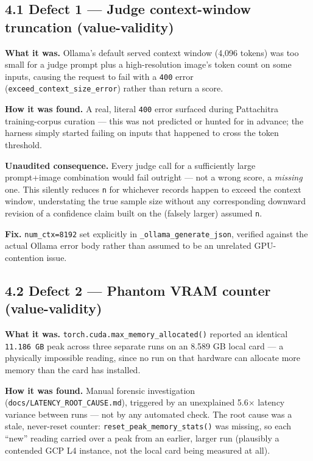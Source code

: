 \hypertarget{defect-1-judge-context-window-truncation-value-validity}{%
\subsection{4.1 Defect 1 --- Judge context-window truncation
(value-validity)}\label{defect-1-judge-context-window-truncation-value-validity}}

\textbf{What it was.} Ollama's default served context window (4,096
tokens) was too small for a judge prompt plus a high-resolution image's
token count on some inputs, causing the request to fail with a
\texttt{400} error (\texttt{exceed\_context\_size\_error}) rather than
return a score.

\textbf{How it was found.} A real, literal \texttt{400} error surfaced
during Pattachitra training-corpus curation --- this was not predicted
or hunted for in advance; the harness simply started failing on inputs
that happened to cross the token threshold.

\textbf{Unaudited consequence.} Every judge call for a sufficiently
large prompt+image combination would fail outright --- not a wrong
score, a \emph{missing} one. This silently reduces \texttt{n} for
whichever records happen to exceed the context window, understating the
true sample size without any corresponding downward revision of a
confidence claim built on the (falsely larger) assumed \texttt{n}.

\textbf{Fix.} \texttt{num\_ctx=8192} set explicitly in
\texttt{\_ollama\_generate\_json}, verified against the actual Ollama
error body rather than assumed to be an unrelated GPU-contention issue.

\hypertarget{defect-2-phantom-vram-counter-value-validity}{%
\subsection{4.2 Defect 2 --- Phantom VRAM counter
(value-validity)}\label{defect-2-phantom-vram-counter-value-validity}}

\textbf{What it was.} \texttt{torch.cuda.max\_memory\_allocated()}
reported an identical \texttt{11.186\ GB} peak across three separate
runs on an 8.589 GB local card --- a physically impossible reading,
since no run on that hardware can allocate more memory than the card has
installed.

\textbf{How it was found.} Manual forensic investigation
(\texttt{docs/LATENCY\_ROOT\_CAUSE.md}), triggered by an unexplained
5.6× latency variance between runs --- not by any automated check. The
root cause was a stale, never-reset counter:
\texttt{reset\_peak\_memory\_stats()} was missing, so each ``new''
reading carried over a peak from an earlier, larger run (plausibly a
contended GCP L4 instance, not the local card being measured at all).

